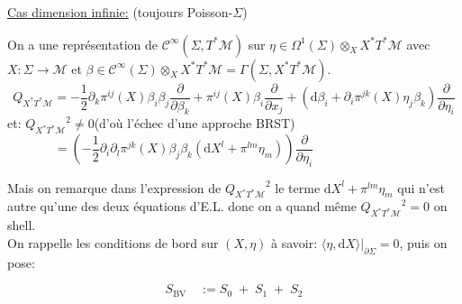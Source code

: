 \documentclass[a4paper,11pt]{article}
\renewcommand{\d}{{\mathrm{d}}}
\newcommand{\dr}[2]{\frac{\partial {#1}}{\partial{#2}}}
\begin{document}
\noindent\underline{Cas dimension infinie:} (toujours Poisson-$\Sigma$)

On a une représentation de $\mathcal{C}^\infty(\Sigma, T^*\mathcal{M})$ sur $\eta \in \Omega^1(\Sigma)\otimes_X X^*T^*\mathcal M$ avec $X:\Sigma\to\mathcal{M}$ et $\beta \in \mathcal{C}^\infty(\Sigma)\otimes_X X^*T^*\mathcal{M} = \Gamma(\Sigma,X^*T^*\mathcal{M})$.
$$Q_{X^*T^*\mathcal M} = -\frac12 \partial_k \pi^{ij}(X) \beta_i\beta_j\dr{}{\beta_k} + \pi^{ij}(X) \beta_i \dr{}{x_j} + (\d \beta_i + \partial_i \pi^{jk}(X)\eta_j \beta_k) \dr{}{\eta_i}$$
et: \quad ${Q_{X^*T^*\mathcal{M}}}^2 \ne 0$\quad\quad (d'où l'échec d'une approche BRST)
$$=\left(-\frac12 \partial_i \partial_l \pi^{jk}(X) \beta_j\beta_k(\d X^l + \pi^{lm} \eta_m)\right)\dr{}{\eta_i} \quad\quad\quad\quad\quad\quad\quad\quad$$

Mais on remarque dans l'expression de ${Q_{X^*T^*\mathcal{M}}}^2$ le terme $\d X^l + \pi^{lm} \eta_m$ qui n'est autre qu'une des deux équations d'E.L. donc on a quand même ${Q_{X^*T^*\mathcal{M}}}^2=0$ on shell.\\
On rappelle les conditions de bord sur $(X,\eta)$ à savoir: $\langle\eta,\d X\rangle\Big|_{\partial\Sigma} = 0$, puis on pose:

$$S_\mathrm{BV} \quad := S_0 \;+\; S_1\;+\;S_2$$
\end{document}
